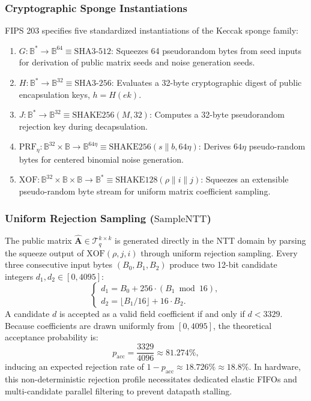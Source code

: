 \subsubsection{Cryptographic Sponge Instantiations}
FIPS 203 specifies five standardized instantiations of the Keccak sponge family:
\begin{enumerate}
    \item $G: \mathbb{B}^* \to \mathbb{B}^{64} \equiv \text{SHA3-512}$: Squeezes 64 pseudorandom bytes from seed inputs for derivation of public matrix seeds and noise generation seeds.
    \item $H: \mathbb{B}^* \to \mathbb{B}^{32} \equiv \text{SHA3-256}$: Evaluates a 32-byte cryptographic digest of public encapsulation keys, $h = H(ek)$.
    \item $J: \mathbb{B}^* \to \mathbb{B}^{32} \equiv \text{SHAKE256}(M, 32)$: Computes a 32-byte pseudorandom rejection key during decapsulation.
    \item $\text{PRF}_\eta: \mathbb{B}^{32} \times \mathbb{B} \to \mathbb{B}^{64\eta} \equiv \text{SHAKE256}(s \parallel b, 64\eta)$: Derives $64\eta$ pseudo-random bytes for centered binomial noise generation.
    \item $\text{XOF}: \mathbb{B}^{32} \times \mathbb{B} \times \mathbb{B} \to \mathbb{B}^* \equiv \text{SHAKE128}(\rho \parallel i \parallel j)$: Squeezes an extensible pseudo-random byte stream for uniform matrix coefficient sampling.
\end{enumerate}

\subsubsection{Uniform Rejection Sampling (\texorpdfstring{$\text{SampleNTT}$}{SampleNTT})}
The public matrix $\hat{\mathbf{A}} \in \mathcal{T}_q^{k \times k}$ is generated directly in the NTT domain by parsing the squeeze output of $\text{XOF}(\rho, j, i)$ through uniform rejection sampling. Every three consecutive input bytes $(B_0, B_1, B_2)$ produce two 12-bit candidate integers $d_1, d_2 \in [0, 4095]$:
\begin{equation}
\label{eq:sample_ntt_unpack}
\begin{cases}
d_1 = B_0 + 256 \cdot (B_1 \bmod 16), \\
d_2 = \lfloor B_1 / 16 \rfloor + 16 \cdot B_2.
\end{cases}
\end{equation}
A candidate $d$ is accepted as a valid field coefficient if and only if $d < 3329$. Because coefficients are drawn uniformly from $[0, 4095]$, the theoretical acceptance probability is:
\begin{equation}
\label{eq:acceptance_prob}
p_{\text{acc}} = \frac{3329}{4096} \approx 81.274\%,
\end{equation}
inducing an expected rejection rate of $1 - p_{\text{acc}} \approx 18.726\% \approx 18.8\%$. In hardware, this non-deterministic rejection profile necessitates dedicated elastic FIFOs and multi-candidate parallel filtering to prevent datapath stalling.

